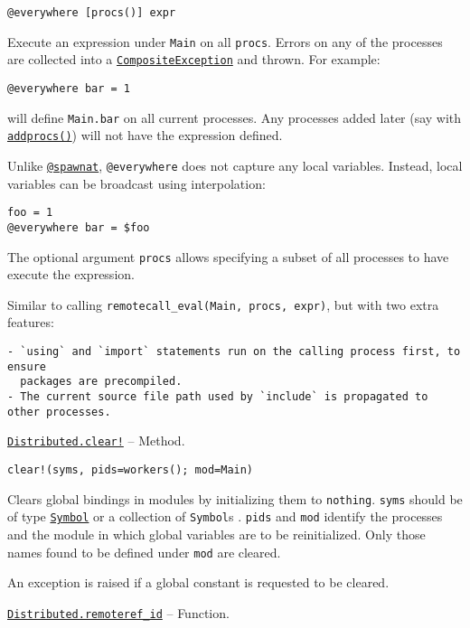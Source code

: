 \begin{adjustwidth}{2em}{0pt}


\begin{verbatim}
@everywhere [procs()] expr
\end{verbatim}

Execute an expression under \texttt{Main} on all \texttt{procs}. Errors on any of the processes are collected into a \hyperlink{15047752250898038281}{\texttt{CompositeException}} and thrown. For example:


\begin{lstlisting}
@everywhere bar = 1
\end{lstlisting}

will define \texttt{Main.bar} on all current processes. Any processes added later (say with \hyperlink{2657399037748470653}{\texttt{addprocs()}}) will not have the expression defined.

Unlike \hyperlink{11231712027010946923}{\texttt{@spawnat}}, \texttt{@everywhere} does not capture any local variables. Instead, local variables can be broadcast using interpolation:


\begin{lstlisting}
foo = 1
@everywhere bar = $foo
\end{lstlisting}

The optional argument \texttt{procs} allows specifying a subset of all processes to have execute the expression.

Similar to calling \texttt{remotecall\_eval(Main, procs, expr)}, but with two extra features:


\begin{lstlisting}
- `using` and `import` statements run on the calling process first, to ensure
  packages are precompiled.
- The current source file path used by `include` is propagated to other processes.
\end{lstlisting}



\end{adjustwidth}
\hypertarget{4315397740230752755}{}
\hyperlink{4315397740230752755}{\texttt{Distributed.clear!}}  -- {Method.}

\begin{adjustwidth}{2em}{0pt}


\begin{verbatim}
clear!(syms, pids=workers(); mod=Main)
\end{verbatim}

Clears global bindings in modules by initializing them to \texttt{nothing}. \texttt{syms} should be of type \hyperlink{18332791376992528422}{\texttt{Symbol}} or a collection of \texttt{Symbol}s . \texttt{pids} and \texttt{mod} identify the processes and the module in which global variables are to be reinitialized. Only those names found to be defined under \texttt{mod} are cleared.

An exception is raised if a global constant is requested to be cleared.



\end{adjustwidth}
\hypertarget{10046899291571146856}{}
\hyperlink{10046899291571146856}{\texttt{Distributed.remoteref\_id}}  -- {Function.}

